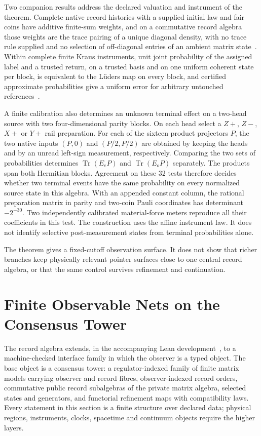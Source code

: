 \documentclass[11pt]{article}
\theoremstyle{remark}
\theoremstyle{plain}
\begin{document}
Two companion results address the declared valuation and instrument of the
theorem. Complete native record histories with a supplied initial law and fair
coins have additive finite-sum weights, and on a commutative record algebra
those weights are the trace pairing of a unique diagonal density, with no trace
rule supplied and no selection of off-diagonal entries of an ambient matrix
state~\cite{ophrepo}. Within complete finite Kraus instruments, unit joint
probability of the assigned label and a trusted return, on a trusted basis and
on one uniform coherent state per block, is equivalent to the L\"uders map on
every block, and certified approximate probabilities give a uniform error for
arbitrary untouched references~\cite{eventalgebraLean}.

A finite calibration also determines an unknown terminal effect on a
two-head source with two four-dimensional parity blocks. On each
head select a $Z+$, $Z-$, $X+$ or $Y+$ rail preparation. For each of
the sixteen product projectors $P$, the two native inputs $(P,0)$ and
$(P/2,P/2)$ are obtained by keeping the heads and by an unread
left-sign measurement, respectively. Comparing the two sets of
probabilities determines $\operatorname{Tr}(E_eP)$ and
$\operatorname{Tr}(E_oP)$ separately. The products span both
Hermitian blocks. Agreement on these 32 tests therefore decides
whether two terminal events have the same probability on every
normalized source state in this algebra. With an appended constant
column, the rational preparation matrix in parity and two-coin
Pauli coordinates has determinant $-2^{-30}$. Two independently
calibrated material-force meters reproduce all their coefficients
in this test. The construction uses the affine instrument law. It
does not identify selective post-measurement states from terminal
probabilities alone.

The theorem gives a fixed-cutoff observation surface. It does not show
that richer branches keep physically relevant pointer surfaces close to one
central record algebra, or that the same control survives refinement and
continuation.

\section{Finite Observable Nets on the Consensus Tower}
\label{sec:finite-observable-nets}
\label{sec:operational-observer-layer}

The record algebra extends, in the accompanying Lean
development~\cite{ophrepo}, to a machine-checked interface family in which
the observer is a typed object. The base object is a consensus tower: a
regulator-indexed family of finite matrix models carrying observer and
record fibres, observer-indexed record orders, commutative public record
subalgebras of the private matrix algebra, selected states and generators,
and functorial refinement maps with compatibility laws. Every statement in
this section is a finite structure over declared data; physical regions,
instruments, clocks, spacetime and continuum objects require the higher
layers.
\end{document}
